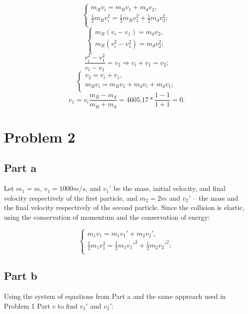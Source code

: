 \documentclass{article}
\begin{document}
\[
\begin{cases}
m_Rv_i = m_Rv_1 + m_dv_2,\\
\frac{1}{2}m_Rv_i^2 = \frac{1}{2}m_Rv_1^2 + \frac{1}{2}m_dv_2^2;\\
\end{cases}
\]
\[
\begin{cases}
m_R(v_i - v_1) = m_dv_2,\\
m_R(v_i^2 - v_1^2) = m_dv_2^2;\\
\end{cases}
\]
\[
\frac{v_i^2 - v_1^2}{v_i - v_1} = v_2 \Rightarrow v_i + v_1 = v_2;
\]
\[
\begin{cases}
v_2 = v_i + v_1,\\
m_Rv_i = m_Rv_1 + m_dv_i + m_dv_1;\\
\end{cases}
\]
\[
v_1 = v_i\frac{m_R - m_d}{m_R + m_d} = 4605.17 * \frac{1 - 1}{1 + 1} = 0.
\]

\section*{Problem 2}
\subsection*{Part a}
Let $m_1 = m$, $v_1 = 1000m/s$, and $v_1\prime$ be the mass, initial velocity, and final velocity respectively of the first particle, and $m_2 = 2m$ and $v_2\prime$ -- the mass and the final velocity respectively of the second particle. Since the collision is elastic, using the conservation of momentum and the conservation of energy:

\[
\begin{cases}
m_1v_1 = m_1v_1\prime + m_2v_2\prime,\\
\frac{1}{2}m_1v_1^2 = \frac{1}{2}m_1v_1\prime^2 + \frac{1}{2}m_2v_2\prime^2;\\
\end{cases}
\]

\subsection*{Part b}
Using the system of equations from Part a and the same approach used in Problem 1 Part c to find $v_1\prime$ and $v_2\prime$:
\end{document}
